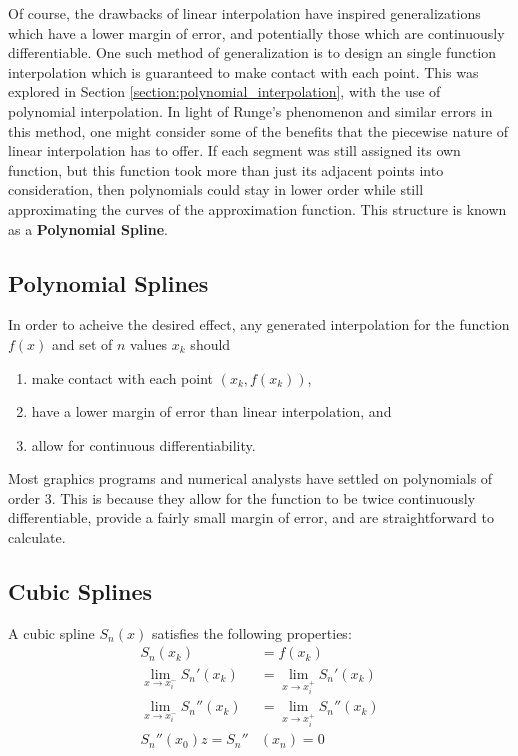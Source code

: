 \documentclass{article}
\begin{document}
Of course, the drawbacks of linear interpolation have inspired generalizations which have a lower margin of error, and potentially those which are continuously differentiable. One such method of generalization is to design an single function interpolation which is guaranteed to make contact with each point. This was explored in Section \ref{section:polynomial_interpolation}, with the use of polynomial interpolation. In light of Runge's phenomenon and similar errors in this method, one might consider some of the benefits that the piecewise nature of linear interpolation has to offer. If each segment was still assigned its own function, but this function took more than just its adjacent points into consideration, then polynomials could stay in lower order while still approximating the curves of the approximation function. This structure is known as a \textbf{Polynomial Spline}.

\subsection{Polynomial Splines}

In order to acheive the desired effect, any generated interpolation for the function $f(x)$ and set of $n$ values $x_k$ should
\begin{enumerate}
    \item make contact with each point $(x_k, f(x_k))$,
    \item have a lower margin of error than linear interpolation, and
    \item allow for continuous differentiability.
\end{enumerate}

Most graphics programs and numerical analysts have settled on polynomials of order 3. This is because they allow for the function to be twice continuously differentiable, provide a fairly small margin of error, and are straightforward to calculate.

\subsection{Cubic Splines}

A cubic spline $S_n(x)$ satisfies the following properties:
\begin{align}
    S_n(x_k)                    & = f(x_k)                      \\
    \lim_{x\to x_i^-}S_n'(x_k)  & = \lim_{x\to x_i^+}S_n'(x_k)  \\
    \lim_{x\to x_i^-}S_n''(x_k) & = \lim_{x\to x_i^+}S_n''(x_k) \\
    S_n''(x_0) z = S_n''        & (x_n) = 0
    \label{eq:zero_at_endpoints}
\end{align}
\end{document}
